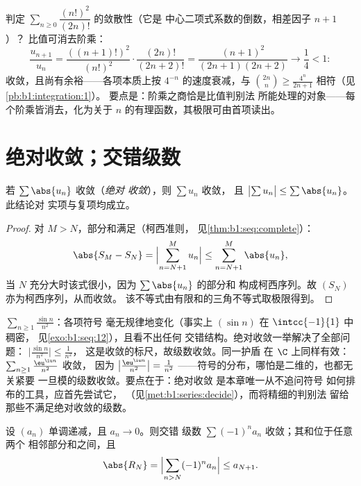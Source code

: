 \begin{example}[阶乘对决中的比值判别法]\label{ex:b1:series:ratiobinom}
判定 $\sum_{n\geq0} \dfrac{(n!)^2}{(2n)!}$ 的敛散性（它是
中心二项式系数的倒数，相差因子 $n + 1$）？
比值可消去阶乘：
\[
\frac{u_{n+1}}{u_n}
= \frac{((n+1)!)^2}{(n!)^2}\cdot\frac{(2n)!}{(2n+2)!}
= \frac{(n+1)^2}{(2n+1)(2n+2)}
\longrightarrow \frac14 < 1 :
\]
收敛，且尚有余裕——各项本质上按
$4^{-n}$ 的速度衰减，与 $\binom{2n}{n} \geq
\frac{4^n}{2n+1}$ 相符（见\cref{pb:b1:integration:1}）。
要点是：阶乘之商恰是比值判别法
所能处理的对象——每个阶乘皆消去，化为关于
$n$ 的有理函数，其极限可由首项读出。
\end{example}

\section{绝对收敛；交错级数}

\begin{theorem}[绝对收敛]\label{thm:b1:series:absolute}
若 $\sum \abs{u_n}$ 收敛（\emph{绝对
收敛}），则 $\sum u_n$ 收敛，
且 $\bigl|\sum u_n\bigr| \leq \sum \abs{u_n}$。此结论对
实项与复项均成立。
\end{theorem}

\begin{proof}
对 $M > N$，部分和满足（柯西准则，
见\cref{thm:b1:seq:complete}）：
\[
\abs{S_M - S_N} = \Bigl| \sum_{n=N+1}^{M} u_n \Bigr|
\leq \sum_{n=N+1}^{M} \abs{u_n},
\]
当 $N$ 充分大时该式很小，因为 $\sum\abs{u_n}$ 的部分和
构成柯西序列。故 $(S_N)$ 亦为柯西序列，从而收敛。
该不等式由有限和的三角不等式取极限得到。
\end{proof}

\begin{example}\label{ex:b1:series:absexamples}
$\sum_{n\geq1} \frac{\sin n}{n^2}$：各项符号
毫无规律地变化（事实上 $(\sin n)$ 在 $\intcc{-1}{1}$ 中稠密，
见\cref{exo:b1:seq:12}），且看不出任何
交错结构。绝对收敛一举解决了全部问题：
$\bigl|\frac{\sin n}{n^2}\bigr| \leq \frac{1}{n^2}$，
这是收敛的标尺，故级数收敛。同一护盾
在 $\C$ 上同样有效：$\sum_{n\geq1}\frac{\eu^{\iu n}}{n^2}$ 收敛，
因为 $\bigl|\frac{\eu^{\iu n}}{n^2}\bigr| = \frac{1}{n^2}$
——符号的分布，哪怕是二维的，也都无关紧要
一旦模的级数收敛。要点在于：绝对收敛
是本章唯一从不追问符号
如何排布的工具，应首先尝试它，
（见\cref{met:b1:series:decide}），而将精细的判别法
留给那些不满足绝对收敛的级数。
\end{example}

\begin{theorem}[交错级数判别法]\label{thm:b1:series:alternating}
设 $(a_n)$ 单调递减，且 $a_n \to 0$。则交错
级数 $\sum (-1)^n a_n$ 收敛；其和位于任意两个
相邻部分和之间，且
\[
\abs{R_N} = \Bigl| \sum_{n > N} (-1)^n a_n \Bigr| \leq a_{N+1} .
\]
\end{theorem}

